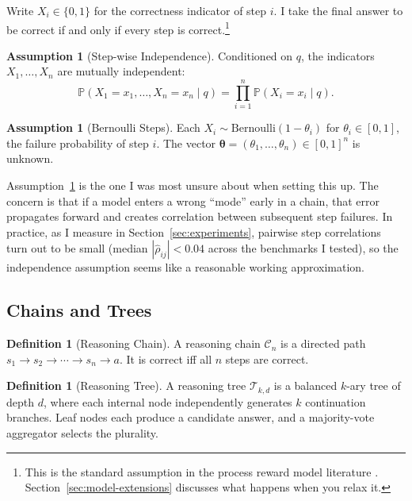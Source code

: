 \documentclass[11pt]{article}
\theoremstyle{plain}
\theoremstyle{definition}
\newtheorem{definition}[theorem]{Definition}
\newtheorem{assumption}[theorem]{Assumption}
\newcommand{\Prob}{\mathbb{P}}
\newcommand{\tree}{\mathcal{T}}
\newcommand{\chain}{\mathcal{C}}
\newcommand{\thetavec}{\bm{\theta}}
\begin{document}
Write $X_i \in \{0,1\}$ for the correctness indicator of step $i$. I take the
final answer to be correct if and only if every step is correct.\footnote{This
is the standard assumption in the process reward model literature
\citep{lightman2023let}. Section~\ref{sec:model-extensions} discusses what
happens when you relax it.}

\begin{assumption}[Step-wise Independence]\label{ass:independence}
  Conditioned on $q$, the indicators $X_1,\ldots,X_n$ are mutually independent:
  \[
    \Prob(X_1=x_1,\ldots,X_n=x_n \mid q) = \prod_{i=1}^n \Prob(X_i=x_i \mid q).
  \]
\end{assumption}

\begin{assumption}[Bernoulli Steps]\label{ass:bernoulli}
  Each $X_i \sim \mathrm{Bernoulli}(1-\theta_i)$ for $\theta_i \in [0,1]$,
  the failure probability of step $i$. The vector
  $\thetavec = (\theta_1,\ldots,\theta_n) \in [0,1]^n$ is unknown.
\end{assumption}

Assumption~\ref{ass:independence} is the one I was most unsure about when
setting this up. The concern is that if a model enters a wrong ``mode'' early
in a chain, that error propagates forward and creates correlation between
subsequent step failures. In practice, as I measure in
Section~\ref{sec:experiments}, pairwise step correlations turn out to be
small (median $|\hat\rho_{ij}| < 0.04$ across the benchmarks I tested), so
the independence assumption seems like a reasonable working approximation.

\subsection{Chains and Trees}

\begin{definition}[Reasoning Chain]\label{def:chain}
  A reasoning chain $\chain_n$ is a directed path
  $s_1 \to s_2 \to \cdots \to s_n \to a$.
  It is correct iff all $n$ steps are correct.
\end{definition}

\begin{definition}[Reasoning Tree]\label{def:tree}
  A reasoning tree $\tree_{k,d}$ is a balanced $k$-ary tree of depth $d$,
  where each internal node independently generates $k$ continuation branches.
  Leaf nodes each produce a candidate answer, and a majority-vote aggregator
  selects the plurality.
\end{definition}
\end{document}
